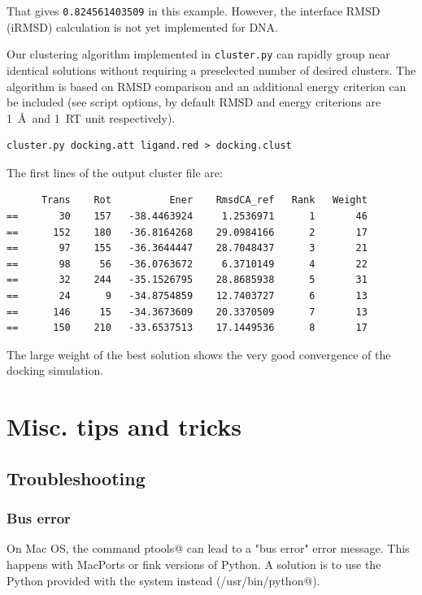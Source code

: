 \documentclass[12pt,a4paper]{article}
\begin{document}
That gives {\tt 0.824561403509} in this example. However, the interface 
RMSD (iRMSD) calculation is not yet implemented for DNA.


Our clustering algorithm implemented in {\tt cluster.py} can rapidly group
near identical solutions without requiring a preselected number of desired clusters.
The algorithm is based on RMSD comparison and an additional energy criterion can 
be included (see script options, by default RMSD and energy criterions are 
1~\AA\ and 1~RT unit respectively).

\begin{verbatim}
cluster.py docking.att ligand.red > docking.clust
\end{verbatim}

The first lines of the output cluster file are:

\linenumbers*
\begin{verbatim}
      Trans    Rot          Ener    RmsdCA_ref   Rank   Weight
==       30    157   -38.4463924     1.2536971      1       46
==      152    180   -36.8164268    29.0984166      2       17
==       97    155   -36.3644447    28.7048437      3       21
==       98     56   -36.0763672     6.3710149      4       22
==       32    244   -35.1526795    28.8685938      5       31
==       24      9   -34.8754859    12.7403727      6       13
==      146     15   -34.3673609    20.3370509      7       13
==      150    210   -33.6537513    17.1449536      8       17
\end{verbatim}
\nolinenumbers

The large weight of the best solution shows the very good convergence of the
docking simulation.



\newpage
\section{Misc. tips and tricks}


\subsection{Troubleshooting}

\subsubsection{Bus error}

On Mac OS, the command \verb@import ptools@ can lead to a "bus error" 
error message. This happens with MacPorts or fink versions of Python. 
A solution is to use the Python provided with the system instead 
(\verb@/usr/bin/python@).
\end{document}
